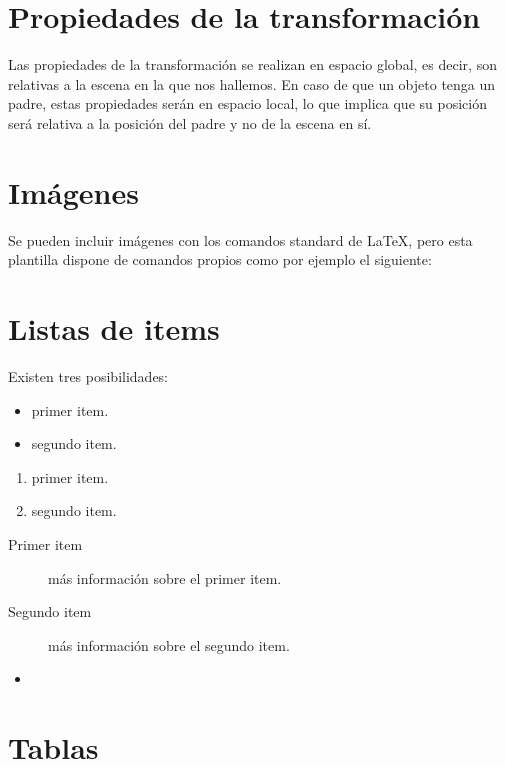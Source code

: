 \section{Propiedades de la transformación}
Las propiedades de la transformación se realizan en espacio global, es decir, son relativas a la escena en la que nos hallemos. En caso de que un objeto tenga un padre, estas propiedades serán en espacio local, lo que implica que su posición será relativa a la posición del padre y no de la escena en sí.

\section{Imágenes}

Se pueden incluir imágenes con los comandos standard de \LaTeX, pero esta plantilla dispone de comandos propios como por ejemplo el siguiente:




\section{Listas de items}

Existen tres posibilidades:

\begin{itemize}
	\item primer item.
	\item segundo item.
\end{itemize}

\begin{enumerate}
	\item primer item.
	\item segundo item.
\end{enumerate}

\begin{description}
	\item[Primer item] más información sobre el primer item.
	\item[Segundo item] más información sobre el segundo item.
\end{description}
	
\begin{itemize}
\item 
\end{itemize}

\section{Tablas}

